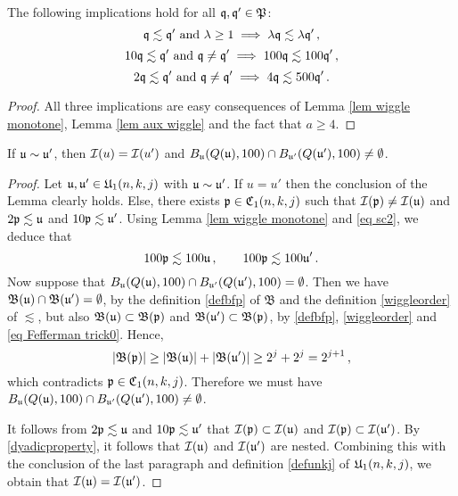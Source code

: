 \begin{lemma}
    The following implications hold for all $\fq, \fq' \in \fP$:
    \begin{equation}
        \label{eq sc1}
        \fq \lesssim \fq' \ \text{and} \ \lambda \ge 1 \implies \lambda \fq \lesssim \lambda \fq'\,,
    \end{equation}
    \begin{equation}
        \label{eq sc2}
        10\fq \lesssim \fq' \ \text{and} \ \fq \ne \fq' \implies 100 \fq \lesssim 100 \fq'\,,
    \end{equation}
    \begin{equation}
        \label{eq sc3}
        2\fq \lesssim \fq' \ \text{and} \ \fq \ne \fq' \implies 4 \fq \lesssim 500 \fq'\,.
    \end{equation}
\end{lemma}

\begin{proof}
    All three implications are easy consequences of Lemma \ref{lem wiggle monotone}, Lemma \ref{lem aux wiggle} and the fact that $a \ge 4$.
\end{proof}

\begin{lemma}
    \label{lem rel claim}
    If $\fu \sim \fu'$, then $\sc(u) = \sc(u')$ and $B_{\fu}(Q(\fu), 100) \cap B_{\fu'}(Q(\fu'), 100) \neq \emptyset$.
\end{lemma}

\begin{proof}
    Let $\fu, \fu' \in \fU_1(n,k,j)$ with $\fu \sim \fu'$. If $u = u'$ then the conclusion of the Lemma clearly holds. Else, there exists $\fp \in \fC_1(n,k,j)$ such that $\sc(\fp) \ne \sc(\fu)$ and  $2 \fp \lesssim \fu$ and $10 \fp \lesssim \fu'$.
    Using Lemma \ref{lem wiggle monotone} and \eqref{eq sc2}, we deduce that
    \begin{equation}
        \label{eq Fefferman trick0}
        100 \fp\lesssim  100 \fu\,, \qquad 100 \fp \lesssim 100\fu'\,.
    \end{equation}
    Now suppose that $B_{\fu}(Q(\fu), 100) \cap B_{\fu'}(Q(\fu'), 100) = \emptyset$. Then we have $\mathfrak{B}(\fu) \cap \mathfrak{B}(\fu') = \emptyset$, by the definition \eqref{defbfp} of $\mathfrak{B}$ and the definition \eqref{wiggleorder} of $\lesssim$, but also $\mathfrak{B}(\fu) \subset \mathfrak{B}(\fp)$ and $\mathfrak{B}(\fu') \subset \mathfrak{B}(\fp)$, by \eqref{defbfp}, \eqref{wiggleorder} and \eqref{eq Fefferman trick0}.
    Hence,
    $$
        |\mathfrak{B}(\fp)| \geq |\mathfrak{B}(\fu)| + |\mathfrak{B}(\fu')| \geq 2^{j} + 2^j = 2^{j+1}\,,
    $$
    which contradicts $\fp \in \fC_1(n,k,j)$. Therefore we must have $B_{\fu}(Q(\fu), 100) \cap B_{\fu'}(Q(\fu'), 100) \ne \emptyset$.

    It follows from $2\fp \lesssim \fu$ and $10\fp \lesssim \fu'$ that $\sc(\fp) \subset \sc(\fu)$ and $\sc(\fp) \subset \sc(\fu')$. By \eqref{dyadicproperty}, it follows that $\sc(\fu)$ and $\sc(\fu')$ are nested.
    Combining this with the conclusion of the last paragraph and definition \eqref{defunkj} of $\fU_1(n,k,j)$, we obtain that $\sc(\fu) = \sc(\fu')$.
\end{proof}

